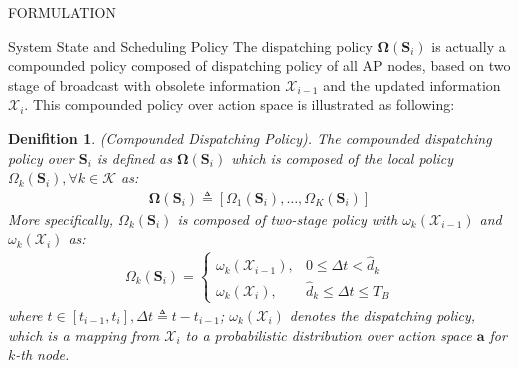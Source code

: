 \documentclass[10pt, conference, letterpaper]{IEEEtran}
\newtheorem{definition}{Denifition}
\newcommand{\define}{\triangleq}
\renewcommand{\vec}{\mathbf}
\newcommand{\apSet}{\mathcal{K}}
\newcommand{\Stat}{\mathbf{S}}
\newcommand{\Obsv}{\mathcal{X}}
\newcommand{\Policy}{\mathbf{\Omega}}
\begin{document}
\begin{section}{FORMULATION}
\begin{subsection}{System State and Scheduling Policy}
            The dispatching policy $\vec{\Omega}(\Stat_i)$ is actually a compounded policy composed of dispatching policy of all AP nodes, based on two stage of broadcast with obsolete information $\Obsv_{i-1}$ and the updated information $\Obsv_{i}$. This compounded policy over action space is illustrated as following:
            \begin{definition}(Compounded Dispatching Policy).
                The compounded dispatching policy over $\Stat_{i}$ is defined as $\Policy(\Stat_{i})$ which is composed of the local policy $\Omega_k(\Stat_{i}), \forall k\in\apSet$ as:
                \begin{align}
                    \vec{\Omega}(\Stat_{i}) \triangleq [\Omega_1(\Stat_{i}), \dots, \Omega_K(\Stat_{i})]
                \end{align}
                More specifically, $\Omega_k(\Stat_{i})$ is composed of two-stage policy with $\omega_k(\Obsv_{i-1})$ and $\omega_k(\Obsv_{i})$ as:
                \begin{align}
                    \Omega_k(\Stat_i) = 
                    \begin{cases}
                        {\omega}_k(\Obsv_{i-1}), & 0 \leq \Delta{t} < \hat{d}_k
                        \\
                        {\omega}_k(\Obsv_{i}), & \hat{d}_k \leq \Delta{t} \leq T_B
                    \end{cases}
                \end{align}
                where $t\in[t_{i-1}, t_{i}], \Delta{t} \define t - t_{i-1}$; ${\omega}_k(\Obsv_i)$ denotes the dispatching policy, which is a mapping from $\Obsv_i$ to a probabilistic distribution over action space $\vec{a}$ for $k$-th node.
            \end{definition}
        \end{subsection}


\end{section}
\end{document}
